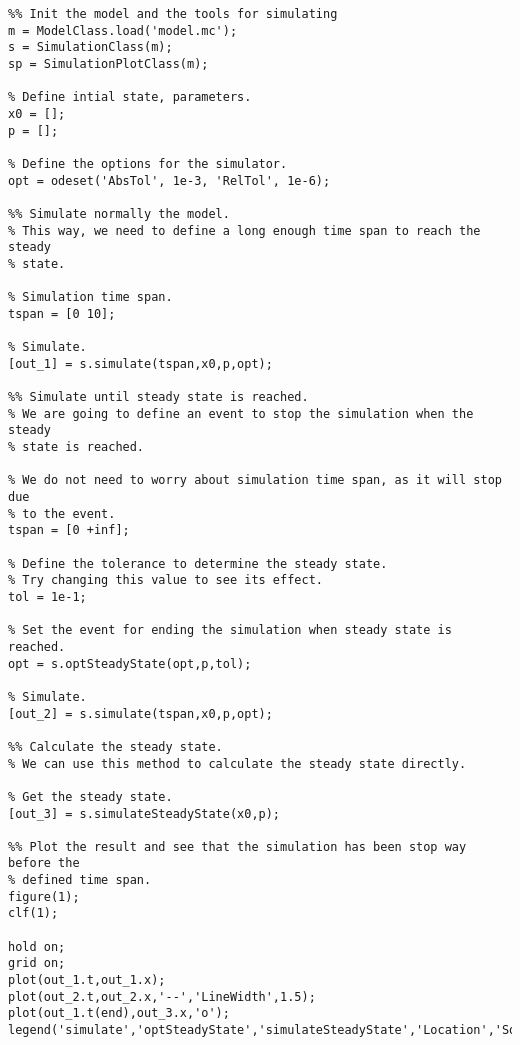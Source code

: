 \documentclass[11pt]{article}
\begin{document}
\begin{lstlisting}
%% Init the model and the tools for simulating
m = ModelClass.load('model.mc');
s = SimulationClass(m);
sp = SimulationPlotClass(m);

% Define intial state, parameters.
x0 = [];
p = [];

% Define the options for the simulator.
opt = odeset('AbsTol', 1e-3, 'RelTol', 1e-6);

%% Simulate normally the model.
% This way, we need to define a long enough time span to reach the steady
% state.

% Simulation time span.
tspan = [0 10]; 

% Simulate.
[out_1] = s.simulate(tspan,x0,p,opt);

%% Simulate until steady state is reached.
% We are going to define an event to stop the simulation when the steady
% state is reached.

% We do not need to worry about simulation time span, as it will stop due
% to the event.
tspan = [0 +inf]; 

% Define the tolerance to determine the steady state.
% Try changing this value to see its effect.
tol = 1e-1;

% Set the event for ending the simulation when steady state is reached.
opt = s.optSteadyState(opt,p,tol);

% Simulate.
[out_2] = s.simulate(tspan,x0,p,opt);

%% Calculate the steady state.
% We can use this method to calculate the steady state directly.

% Get the steady state.
[out_3] = s.simulateSteadyState(x0,p);

%% Plot the result and see that the simulation has been stop way before the 
% defined time span.
figure(1);
clf(1);

hold on;
grid on;
plot(out_1.t,out_1.x);
plot(out_2.t,out_2.x,'--','LineWidth',1.5);
plot(out_1.t(end),out_3.x,'o');
legend('simulate','optSteadyState','simulateSteadyState','Location','SouthEast');
\end{lstlisting}
\end{document}
